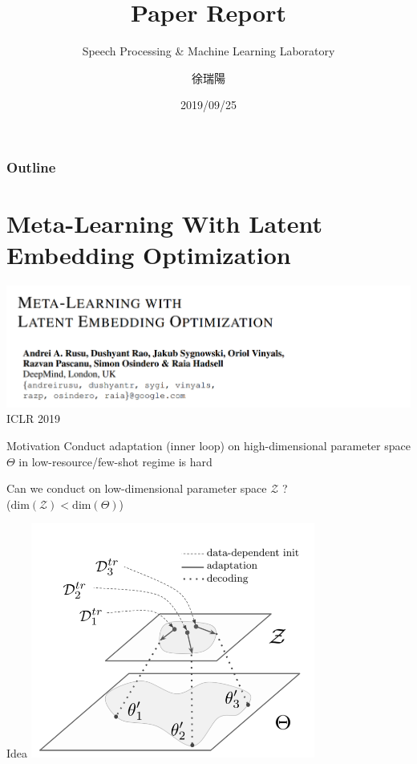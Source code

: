 \documentclass{beamer}
\title{Paper Report}
\subtitle{\textcolor[rgb]{0.00,0.50,1.00}{{Speech Processing \& Machine Learning Laboratory}}}
\author{徐瑞陽}
\date{2019/09/25}
\begin{document}
\begin{frame}
\maketitle
\end{frame}



\begin{frame}
\frametitle{Outline}
\tableofcontents
\end{frame}

\section{Meta-Learning With Latent Embedding Optimization}
\begin{frame}
  \includegraphics[width=\textwidth]{fig/LEO.png}
  \center ICLR 2019
\end{frame}

\begin{frame}{Motivation}
  Conduct adaptation (inner loop) on high-dimensional parameter space $\Theta$ in low-resource/few-shot regime is hard

  \center Can we conduct on low-dimensional parameter space $\mathcal{Z}$ ? \\ 
  ($\text{dim}(\mathcal{Z}) < \text{dim}(\Theta)$)
\end{frame}

\begin{frame}{Idea}
  \center \includegraphics[width=0.7\textwidth]{fig/LEO-idea.png}
\end{frame}
\end{document}
